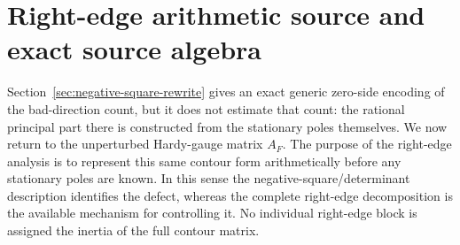 \section{Right-edge arithmetic source and exact source algebra}
\label{sec:right-edge}

Section~\ref{sec:negative-square-rewrite} gives an exact generic zero-side
encoding of the bad-direction count, but it does not estimate that count:
the rational principal part there is constructed from the stationary poles
themselves.  We now return to the unperturbed Hardy-gauge matrix \(A_F\).
The purpose of the right-edge analysis is to represent this same contour form
arithmetically before any stationary poles are known.  In this sense the
negative-square/determinant description identifies the defect, whereas the
complete right-edge decomposition is the available mechanism for controlling
it.  No individual right-edge block is assigned the inertia of the full
contour matrix.


